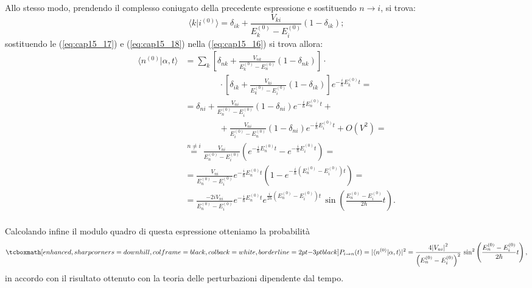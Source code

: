 \documentclass[a4paper,12pt,oneside]{book}
\begin{document}
Allo stesso modo, prendendo il complesso coniugato della precedente espressione e sostituendo $n\rightarrow i $, si trova:
	\begin{equation}
		\langle k\vert i^{(0)}  \rangle  = \delta _{ik} + \frac{V_{ki}}{E_k ^{(0)} - E_i ^{(0)}}\left( 1-\delta _{ik} \right);
	\label{eq:cap15_18}	
	\end{equation}
sostituendo le (\ref{eq:cap15_17}) e (\ref{eq:cap15_18}) nella (\ref{eq:cap15_16}) si trova allora:
	\begin{align}
		\langle n ^{(0)}\vert \alpha , t \rangle &= \sum _ k \left[ \delta _{nk} + \frac{V_{nk}}{E_k ^{(0)}- E_n ^{(0)}} \left(1-\delta _{nk} \right)\right]\cdot \nonumber \\
		&\qquad\qquad \cdot \left[ \delta _{ik} + \frac{V_{ki}}{E_k ^{(0)}- E_i ^{(0)}} \left(1-\delta _{ik} \right)\right] e^{-\frac{i}{\hbar} E_k ^{(0)} t} = \nonumber \\
		&= \delta_{ni} +\frac{V_{ni}}{E_n ^{(0)} -E_i ^{(0)}}\left(1-\delta_{ni} \right) e^{-\frac{i}{\hbar} E_n ^{(0)} t}+ \nonumber \\
		&\qquad \qquad	+\frac{V_{ni}}{E_i ^{(0)} -E_n ^{(0)}}\left(1-\delta_{ni} \right) e^{-\frac{i}{\hbar} E_i ^{(0)} t}+ O(V^2) = \nonumber \\
		& \overset{ n\neq i}{=}\frac{V_{ni}}{E_n ^{(0)} -E_i ^{(0)}} \left(e^{-\frac{i}{\hbar} E_n ^{(0)} t} -e^{-\frac{i}{\hbar} E_i ^{(0)} t}\right) = \nonumber \\
		&= \frac{V_{ni}}{E_n ^{(0)} -E_i ^{(0)}}e^{-\frac{i}{\hbar} E_n ^{(0)} t}\left( 1- e^{-\frac{i}{\hbar} \left(E_n ^{(0)}- E_i ^{(0)}\right) t}\right) = \nonumber \\
&= \frac{-2iV_{ni}}{E_n ^{(0)} -E_i ^{(0)}}e^{-\frac{i}{\hbar} E_n ^{(0)} t}  e^{\frac{i}{2\hbar} \left( E_n ^{(0)} -E_i ^{(0)}\right)t} \, \sin \left( \frac{ E_n ^{(0)} -E_i ^{(0)}}{2\hbar}t \right).
	\end{align}\\
	
Calcolando infine il modulo quadro di questa espressione otteniamo la probabilità
	\begin{equation}
		\tcboxmath[enhanced, sharp corners=downhill, colframe=black, colback=white, borderline={2pt}{-3pt}{black}]{
			P_{i\rightarrow n} (t) = 	\vert\langle n ^{(0)}\vert \alpha , t \rangle \vert ^2 = \frac{4\abs{V_{ni}}^2 }{\left(E_n ^{(0)} -E_i ^{(0)}\right) ^2}\,\sin ^2\left( \frac{ E_n ^{(0)} -E_i ^{(0)}}{2\hbar}t \right),
			}
	\end{equation}
in accordo con il risultato ottenuto con la teoria delle perturbazioni dipendente dal tempo.
\end{document}
